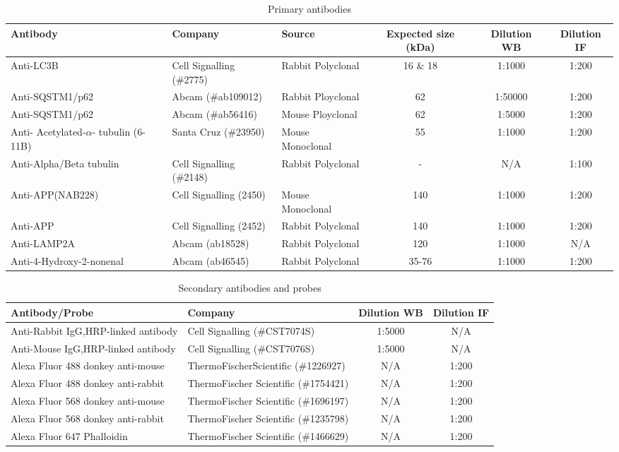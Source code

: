 \begin{landscape}
\begin{table}[p]
\centering
\caption[Primary antibodies]{Primary antibodies}
\label{tab:20_prim}
\begin{tabular}{lllccc}
\toprule
Antibody & Company & Source & Expected size (kDa) & Dilution WB & Dilution IF \\
\midrule
Anti-LC3B & Cell Signalling (\#2775) & Rabbit Polyclonal & 16 \& 18 & 1:1000 & 1:200 \\
Anti-SQSTM1/p62 & Abcam (\#ab109012) & Rabbit Ployclonal & 62 & 1:50000 & 1:200 \\
Anti-SQSTM1/p62 & Abcam (\#ab56416) & Mouse Ployclonal & 62 & 1:5000 & 1:200 \\
Anti- Acetylated-$\alpha$- tubulin (6-11B) & Santa Cruz (\#23950) & Mouse Monoclonal & 55 & 1:1000 & 1:200 \\
Anti-Alpha/Beta tubulin & Cell Signalling (\#2148) & Rabbit Polyclonal & - & N/A & 1:100 \\
Anti-APP(NAB228) & Cell Signalling (2450) & Mouse Monoclonal & 140 & 1:1000 & 1:200 \\
Anti-APP & Cell Signalling (2452) & Rabbit Polyclonal & 140 & 1:1000 & 1:200 \\
Anti-LAMP2A & Abcam (ab18528) & Rabbit Polyclonal & 120 & 1:1000 & N/A \\
Anti-4-Hydroxy-2-nonenal & Abcam (ab46545) & Rabbit Polyclonal & 35-76 & 1:1000 & 1:200 \\
\bottomrule
\end{tabular}
\end{table}
\begin{table}[p]
\centering
\caption[Secondary antibodies and probes]{Secondary antibodies and probes}
\label{tab:20_sec}
\begin{tabular}{llcc}
\toprule
Antibody/Probe & Company & Dilution WB & Dilution IF \\
\midrule
Anti-Rabbit IgG,HRP-linked antibody & Cell Signalling (\#CST7074S) & 1:5000 & N/A \\
Anti-Mouse IgG,HRP-linked antibody & Cell Signalling (\#CST7076S) & 1:5000 & N/A \\
Alexa Fluor 488 donkey anti-mouse & ThermoFischerScientific (\#1226927) & N/A & 1:200 \\
Alexa Fluor 488 donkey anti-rabbit & ThermoFischer Scientific (\#1754421) & N/A & 1:200 \\
Alexa Fluor 568 donkey anti-mouse & ThermoFischer Scientific (\#1696197) & N/A & 1:200 \\
Alexa Fluor 568 donkey anti-rabbit & ThermoFischer Scientific (\#1235798) & N/A & 1:200 \\
Alexa Fluor 647 Phalloidin & ThermoFischer Scientific (\#1466629) & N/A & 1:200 \\
\bottomrule
\end{tabular}
\end{table}
\end{landscape}


